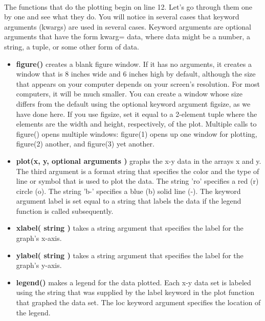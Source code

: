 \documentclass[11pt]{article}
\begin{document}
    \begin{center}
    \end{center}
    { \hspace*{\fill} \\}
    
    The functions that do the plotting begin on line 12. Let's go through
them one by one and see what they do. You will notice in several cases
that keyword arguments (kwargs) are used in several cases. Keyword
arguments are optional arguments that have the form kwarg= data, where
data might be a number, a string, a tuple, or some other form of data.

\begin{itemize}
\item
  \textbf{figure()} creates a blank figure window. If it has no
  arguments, it creates a window that is 8 inches wide and 6 inches high
  by default, although the size that appears on your computer depends on
  your screen's resolution. For most computers, it will be much smaller.
  You can create a window whose size differs from the default using the
  optional keyword argument figsize, as we have done here. If you use
  figsize, set it equal to a 2-element tuple where the elements are the
  width and height, respectively, of the plot. Multiple calls to
  figure() opens multiple windows: figure(1) opens up one window for
  plotting, figure(2) another, and figure(3) yet another.
\item
  \textbf{plot(x, y, optional arguments )} graphs the x-y data in the
  arrays x and y. The third argument is a format string that specifies
  the color and the type of line or symbol that is used to plot the
  data. The string 'ro' specifies a red (r) circle (o). The string 'b-'
  specifies a blue (b) solid line (-). The keyword argument label is set
  equal to a string that labels the data if the legend function is
  called subsequently.
\item
  \textbf{xlabel( string )} takes a string argument that specifies the
  label for the graph's x-axis.
\item
  \textbf{ylabel( string )} takes a string argument that specifies the
  label for the graph's y-axis.
\item
  \textbf{legend()} makes a legend for the data plotted. Each x-y data
  set is labeled using the string that was supplied by the label keyword
  in the plot function that graphed the data set. The loc keyword
  argument specifies the location of the legend.

\end{itemize}
\end{document}
